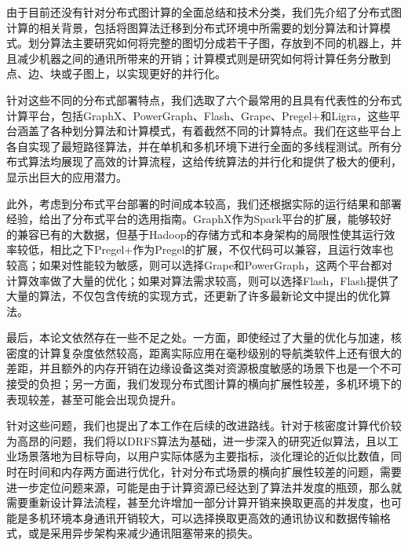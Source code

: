 	由于目前还没有针对分布式图计算的全面总结和技术分类，我们先介绍了分布式图计算的相关背景，包括将图算法迁移到分布式环境中所需要的划分算法和计算模式。划分算法主要研究如何将完整的图切分成若干子图，存放到不同的机器上，并且减少机器之间的通讯所带来的开销；计算模式则是研究如何将计算任务分散到点、边、块或子图上，以实现更好的并行化。
	
	针对这些不同的分布式部署特点，我们选取了六个最常用的且具有代表性的分布式计算平台，包括GraphX、PowerGraph、Flash、Grape、Pregel+和Ligra，这些平台涵盖了各种划分算法和计算模式，有着截然不同的计算特点。我们在这些平台上各自实现了最短路径算法，并在单机和多机环境下进行全面的多线程测试。所有分布式算法均展现了高效的计算流程，这给传统算法的并行化和提供了极大的便利，显示出巨大的应用潜力。
	
	此外，考虑到分布式平台部署的时间成本较高，我们还根据实际的运行结果和部署经验，给出了分布式平台的选用指南。GraphX作为Spark平台的扩展，能够较好的兼容已有的大数据，但基于Hadoop的存储方式和本身架构的局限性使其运行效率较低，相比之下Pregel+作为Pregel的扩展，不仅代码可以兼容，且运行效率也较高；如果对性能较为敏感，则可以选择Grape和PowerGraph，这两个平台都对计算效率做了大量的优化；如果对算法需求较高，则可以选择Flash，Flash提供了大量的算法，不仅包含传统的实现方式，还更新了许多最新论文中提出的优化算法。
	
	最后，本论文依然存在一些不足之处。一方面，即使经过了大量的优化与加速，核密度的计算复杂度依然较高，距离实际应用在毫秒级别的导航类软件上还有很大的差距，并且额外的内存开销在边缘设备这类对资源极度敏感的场景下也是一个不可接受的负担；另一方面，我们发现分布式图计算的横向扩展性较差，多机环境下的表现较差，甚至可能会出现负提升。

	针对这些问题，我们也提出了本工作在后续的改进路线。针对于核密度计算代价较为高昂的问题，我们将以DRFS算法为基础，进一步深入的研究近似算法，且以工业场景落地为目标导向，以用户实际体感为主要指标，淡化理论的近似比数值，同时在时间和内存两方面进行优化，针对分布式场景的横向扩展性较差的问题，需要进一步定位问题来源，可能是由于计算资源已经达到了算法并发度的瓶颈，那么就需要重新设计算法流程，甚至允许增加一部分计算开销来换取更高的并发度，也可能是多机环境本身通讯开销较大，可以选择换取更高效的通讯协议和数据传输格式，或是采用异步架构来减少通讯阻塞带来的损失。
